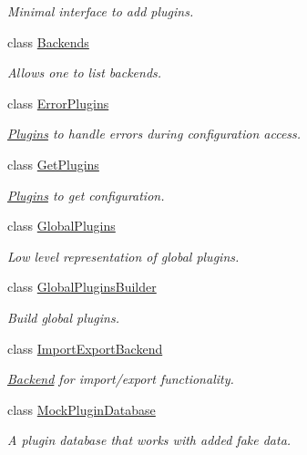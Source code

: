 \begin{DoxyCompactItemize}
\begin{DoxyCompactList}\small\item\em Minimal interface to add plugins. \end{DoxyCompactList}\item 
class \mbox{\hyperlink{classkdb_1_1tools_1_1Backends}{Backends}}
\begin{DoxyCompactList}\small\item\em Allows one to list backends. \end{DoxyCompactList}\item 
class \mbox{\hyperlink{classkdb_1_1tools_1_1ErrorPlugins}{Error\+Plugins}}
\begin{DoxyCompactList}\small\item\em \mbox{\hyperlink{classkdb_1_1tools_1_1Plugins}{Plugins}} to handle errors during configuration access. \end{DoxyCompactList}\item 
class \mbox{\hyperlink{classkdb_1_1tools_1_1GetPlugins}{Get\+Plugins}}
\begin{DoxyCompactList}\small\item\em \mbox{\hyperlink{classkdb_1_1tools_1_1Plugins}{Plugins}} to get configuration. \end{DoxyCompactList}\item 
class \mbox{\hyperlink{classkdb_1_1tools_1_1GlobalPlugins}{Global\+Plugins}}
\begin{DoxyCompactList}\small\item\em Low level representation of global plugins. \end{DoxyCompactList}\item 
class \mbox{\hyperlink{classkdb_1_1tools_1_1GlobalPluginsBuilder}{Global\+Plugins\+Builder}}
\begin{DoxyCompactList}\small\item\em Build global plugins. \end{DoxyCompactList}\item 
class \mbox{\hyperlink{classkdb_1_1tools_1_1ImportExportBackend}{Import\+Export\+Backend}}
\begin{DoxyCompactList}\small\item\em \mbox{\hyperlink{classkdb_1_1tools_1_1Backend}{Backend}} for import/export functionality. \end{DoxyCompactList}\item 
class \mbox{\hyperlink{classkdb_1_1tools_1_1MockPluginDatabase}{Mock\+Plugin\+Database}}
\begin{DoxyCompactList}\small\item\em A plugin database that works with added fake data. \end{DoxyCompactList}\item 

\end{DoxyCompactItemize}
